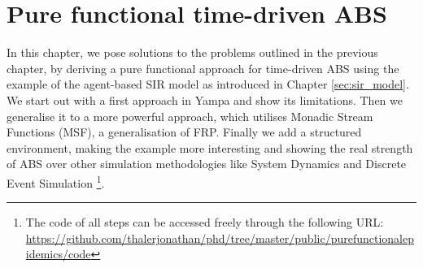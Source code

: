 \chapter{Pure functional time-driven ABS}
\label{ch:timedriven}

In this chapter, we pose solutions to the problems outlined in the previous chapter, by deriving a pure functional approach for time-driven ABS using the example of the agent-based SIR model as introduced in Chapter \ref{sec:sir_model}. We start out with a first approach in Yampa and show its limitations. Then we generalise it to a more powerful approach, which utilises Monadic Stream Functions (MSF), a generalisation of FRP. Finally we add a structured environment, making the example more interesting and showing the real strength of ABS over other simulation methodologies like System Dynamics and Discrete Event Simulation \footnote{The code of all steps can be accessed freely through the following URL: \url{https://github.com/thalerjonathan/phd/tree/master/public/purefunctionalepidemics/code}}.







